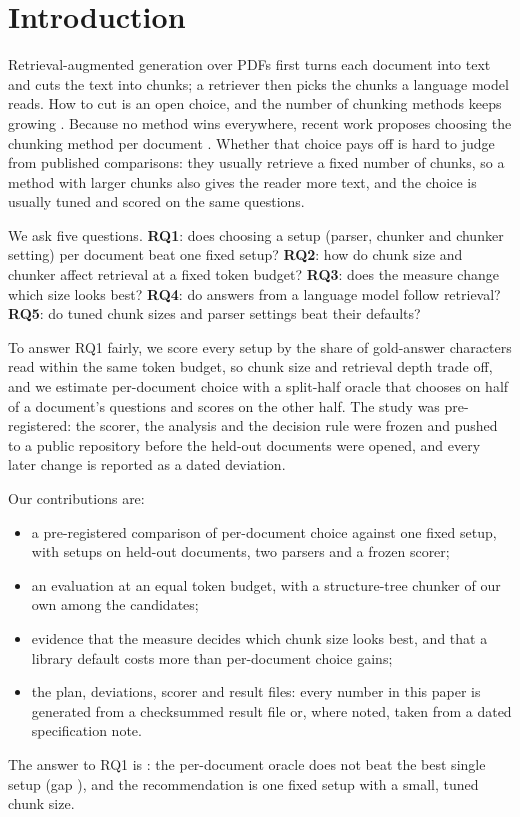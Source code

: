 \section{Introduction}
\label{sec:introduction}

Retrieval-augmented generation over PDFs first turns each document into
text and cuts the text into chunks; a retriever then picks the chunks a
language model reads. How to cut is an open choice, and the number of
chunking methods keeps growing
\citep{smigielski2026chunking,shaukat2026systematic,zhao2025moc,lu2025hichunk}.
Because no method wins everywhere, recent work proposes choosing the
chunking method per document \citep{demourajunior2026adaptive}. Whether
that choice pays off is hard to judge from published comparisons: they
usually retrieve a fixed number of chunks, so a method with larger chunks
also gives the reader more text, and the choice is usually tuned and
scored on the same questions.

We ask five questions. \textbf{RQ1}: does choosing a setup (parser,
chunker and chunker setting) per document beat one fixed setup?
\textbf{RQ2}: how do chunk size and chunker affect retrieval at a fixed
token budget? \textbf{RQ3}: does the measure change which size looks
best? \textbf{RQ4}: do answers from a language model follow retrieval?
\textbf{RQ5}: do tuned chunk sizes and parser settings beat their
defaults?

To answer RQ1 fairly, we score every setup by the share of gold-answer
characters read within the same token budget, so chunk size and retrieval
depth trade off, and we estimate per-document choice with a split-half
oracle that chooses on half of a document's questions and scores on the
other half. The study was pre-registered: the scorer, the analysis and
the decision rule were frozen and pushed to a public repository before
the held-out documents were opened, and every later change is reported
as a dated deviation.

Our contributions are:
\begin{itemize}
\item a pre-registered comparison of per-document choice against one
fixed setup, with \RQoneSetups{} setups on \AccountingMain{} held-out
documents, two parsers and a frozen scorer;
\item an evaluation at an equal token budget, with a structure-tree
chunker of our own among the candidates;
\item evidence that the measure decides which chunk size looks best, and
that a library default costs more than per-document choice gains;
\item the plan, deviations, scorer and result files: every number in
this paper is generated from a checksummed result file or, where noted,
taken from a dated specification note.
\end{itemize}

The answer to RQ1 is \RQoneDecision{}: the per-document oracle does not
beat the best single setup (gap \RQonePrimaryGap{}
\RQonePrimaryGapCI{}), and the recommendation is one fixed setup with a
small, tuned chunk size.
